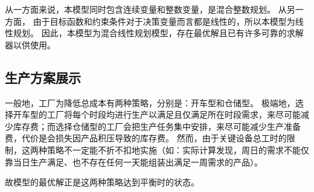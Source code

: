从一方面来说，本模型同时包含连续变量和整数变量，是混合整数规划。
从另一方面， 由于目标函数和约束条件对于决策变量而言都是线性的，所以本模型为线性规划。
因此，本模型为混合线性规划模型，存在最优解且已有许多可靠的求解器以供使用。

\subsection{生产方案展示} %
\label{sub:生产方案展示}

一般地，工厂为降低总成本有两种策略，分别是：开车型和仓储型。
极端地，选择开车型的工厂将每个时段均进行生产以满足且仅满足所在时段需求，来尽可能减少库存费；而选择仓储型的工厂会把生产任务集中安排，来尽可能减少生产准备费，代价是会损失因产品积压导致的库存费。
然而，由于关键设备总工时的限制，这两种策略不一定能不折不扣地实施（如：实际计算发现，周日的需求不能仅靠当日生产满足、也不存在任何一天能组装出满足一周需求的产品）。

故模型的最优解正是这两种策略达到平衡时的状态。






